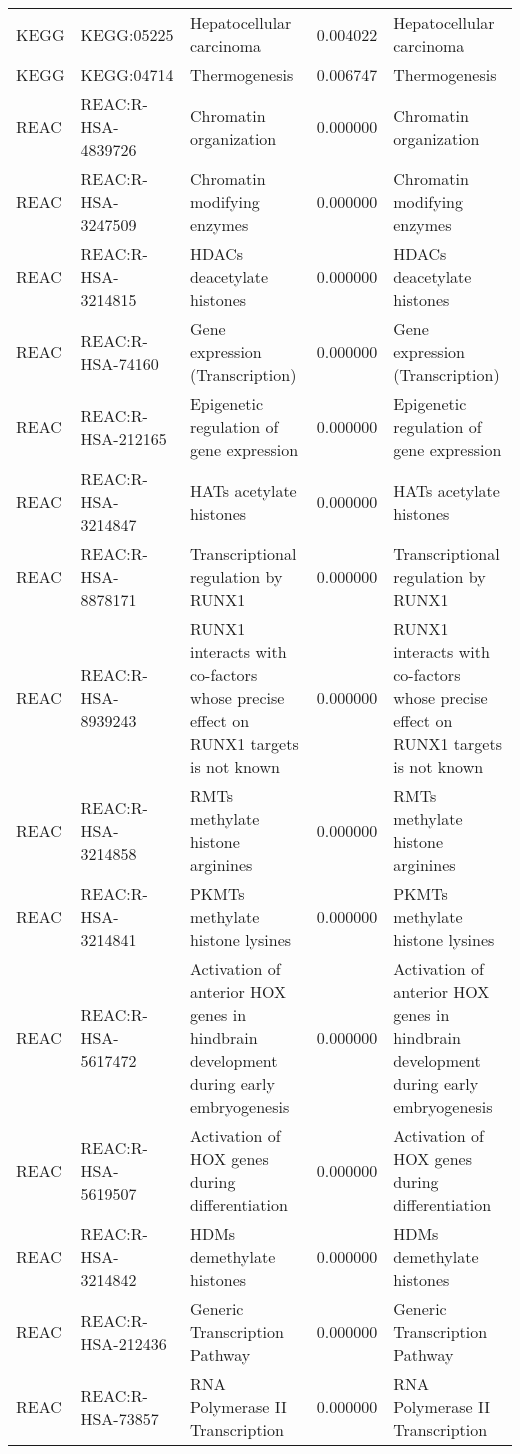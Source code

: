 \begin{tabular}{lllrl}
KEGG & KEGG:05225 & Hepatocellular carcinoma & 0.004022 & Hepatocellular carcinoma \\
KEGG & KEGG:04714 & Thermogenesis & 0.006747 & Thermogenesis \\
REAC & REAC:R-HSA-4839726 & Chromatin organization & 0.000000 & Chromatin organization \\
REAC & REAC:R-HSA-3247509 & Chromatin modifying enzymes & 0.000000 & Chromatin modifying enzymes \\
REAC & REAC:R-HSA-3214815 & HDACs deacetylate histones & 0.000000 & HDACs deacetylate histones \\
REAC & REAC:R-HSA-74160 & Gene expression (Transcription) & 0.000000 & Gene expression (Transcription) \\
REAC & REAC:R-HSA-212165 & Epigenetic regulation of gene expression & 0.000000 & Epigenetic regulation of gene expression \\
REAC & REAC:R-HSA-3214847 & HATs acetylate histones & 0.000000 & HATs acetylate histones \\
REAC & REAC:R-HSA-8878171 & Transcriptional regulation by RUNX1 & 0.000000 & Transcriptional regulation by RUNX1 \\
REAC & REAC:R-HSA-8939243 & RUNX1 interacts with co-factors whose precise effect on RUNX1 targets is not known & 0.000000 & RUNX1 interacts with co-factors whose precise effect on RUNX1 targets is not known \\
REAC & REAC:R-HSA-3214858 & RMTs methylate histone arginines & 0.000000 & RMTs methylate histone arginines \\
REAC & REAC:R-HSA-3214841 & PKMTs methylate histone lysines & 0.000000 & PKMTs methylate histone lysines \\
REAC & REAC:R-HSA-5617472 & Activation of anterior HOX genes in hindbrain development during early embryogenesis & 0.000000 & Activation of anterior HOX genes in hindbrain development during early embryogenesis \\
REAC & REAC:R-HSA-5619507 & Activation of HOX genes during differentiation & 0.000000 & Activation of HOX genes during differentiation \\
REAC & REAC:R-HSA-3214842 & HDMs demethylate histones & 0.000000 & HDMs demethylate histones \\
REAC & REAC:R-HSA-212436 & Generic Transcription Pathway & 0.000000 & Generic Transcription Pathway \\
REAC & REAC:R-HSA-73857 & RNA Polymerase II Transcription & 0.000000 & RNA Polymerase II Transcription \\
\bottomrule
\end{tabular}

